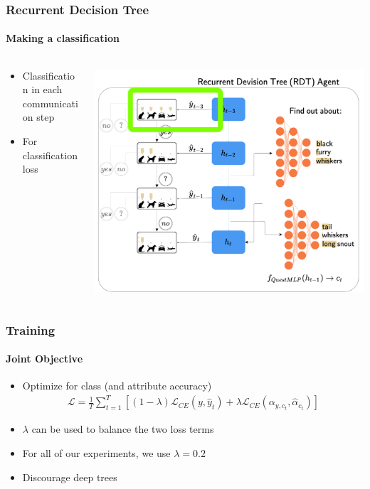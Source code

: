 \documentclass[9pt]{beamer}
\begin{document}
\begin{frame}
\frametitle{Recurrent Decision Tree}
\framesubtitle{Making a classification}
\begin{columns}[T]
\begin{column}{.5\textwidth}
\begin{itemize}
	\item Classification in each communication step
	\item For classification loss
\end{itemize}
\end{column}
\begin{column}{.5\textwidth}
\includegraphics[width=\textwidth]{images/urdtc_parts_classMLP.pdf}
\end{column}
\end{columns}
\end{frame}

\begin{frame}
\frametitle{Training}
\framesubtitle{Joint Objective}
\begin{itemize}
	\item Optimize for class (and attribute accuracy)
	\begin{align*}
	\mathcal{L} = \frac{1}{T}\sum_{t=1}^{T}\left[(1-\lambda)\mathcal{L}_{CE}(y,\hat{y}_t) + \lambda \mathcal{L}_{CE}(\alpha_{y,c_t},\hat{\alpha}_{c_t}) \right]
	\end{align*}
	\item $\lambda$ can be used to balance the two loss terms
	\item For all of our experiments, we use $\lambda=0.2$
	\item Discourage deep trees%
\end{itemize}
\end{frame}
\end{document}
